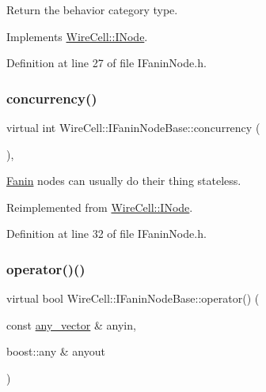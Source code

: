 Return the behavior category type. 



Implements \hyperlink{class_wire_cell_1_1_i_node_a58c07f15b165e5fb33bbc7b2e047b39b}{Wire\+Cell\+::\+I\+Node}.



Definition at line 27 of file I\+Fanin\+Node.\+h.

\mbox{\label{class_wire_cell_1_1_i_fanin_node_base_af0f007d93e510830bccbc186c6642749}} 
\subsubsection{\texorpdfstring{concurrency()}{concurrency()}}
{\footnotesize\ttfamily virtual int Wire\+Cell\+::\+I\+Fanin\+Node\+Base\+::concurrency (\begin{DoxyParamCaption}{ }\end{DoxyParamCaption})\hspace{0.3cm}{\ttfamily [inline]}, {\ttfamily [virtual]}}



\hyperlink{struct_wire_cell_1_1_fanin}{Fanin} nodes can usually do their thing stateless. 



Reimplemented from \hyperlink{class_wire_cell_1_1_i_node_a87d2b7293da4f6955e389ac6a2011306}{Wire\+Cell\+::\+I\+Node}.



Definition at line 32 of file I\+Fanin\+Node.\+h.

\mbox{\label{class_wire_cell_1_1_i_fanin_node_base_a7fd741cc204d2eb03402709bff0694f2}} 
\subsubsection{\texorpdfstring{operator()()}{operator()()}}
{\footnotesize\ttfamily virtual bool Wire\+Cell\+::\+I\+Fanin\+Node\+Base\+::operator() (\begin{DoxyParamCaption}\item[{const \hyperlink{class_wire_cell_1_1_i_fanin_node_base_a9dc315fe5b56f41f13ea247fc4b7f34b}{any\+\_\+vector} \&}]{anyin,  }\item[{boost\+::any \&}]{anyout }\end{DoxyParamCaption})\hspace{0.3cm}{\ttfamily [pure virtual]}}



